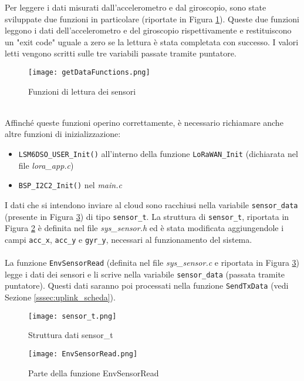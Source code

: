 Per leggere i dati misurati dall'accelerometro e dal giroscopio, sono state sviluppate due funzioni in particolare (riportate in Figura \ref{fig:lettura_sensori}). Queste due funzioni leggono i dati dell'accelerometro e del giroscopio rispettivamente e restituiscono un "exit code" uguale a zero se la lettura è stata completata con successo. I valori letti vengono scritti sulle tre variabili passate tramite puntatore.
\begin{figure}[h!]
  \centering
  \texttt{[image: getDataFunctions.png]}
  \caption{Funzioni di lettura dei sensori}
  \label{fig:lettura_sensori}
\end{figure}
\\Affinché queste funzioni operino correttamente, è necessario richiamare anche altre funzioni di inizializzazione:
\begin{itemize}
  \item \Verb|LSM6DSO_USER_Init()| all'interno della funzione \Verb|LoRaWAN_Init| (dichiarata nel file \textit{lora\_app.c})
  \item \Verb|BSP_I2C2_Init()| nel \textit{main.c}
\end{itemize}
I dati che si intendono inviare al cloud sono racchiusi nella variabile \Verb|sensor_data| (presente in Figura \ref{fig:envsensorread}) di tipo \Verb|sensor_t|. La struttura di \Verb|sensor_t|, riportata in Figura \ref{fig:sensor_t} è definita nel file \textit{sys\_sensor.h} ed è stata modificata aggiungendole i campi \Verb|acc_x|, \Verb|acc_y| e \Verb|gyr_y|, necessari al funzionamento del sistema.
\\\\La funzione \Verb|EnvSensorRead| (definita nel file \textit{sys\_sensor.c} e riportata in Figura \ref{fig:envsensorread}) legge i dati dei sensori e li scrive nella variabile \Verb|sensor_data| (passata tramite puntatore). Questi dati saranno poi processati nella funzione \Verb|SendTxData| (vedi Sezione \ref{sssec:uplink_scheda}).
\begin{figure}[H]
  \centering
  \texttt{[image: sensor\_t.png]}
  \caption{Struttura dati sensor\_t}
  \label{fig:sensor_t}
\end{figure}
\begin{figure}[H]
  \centering
  \texttt{[image: EnvSensorRead.png]}
  \caption{Parte della funzione EnvSensorRead}
  \label{fig:envsensorread}
\end{figure}

